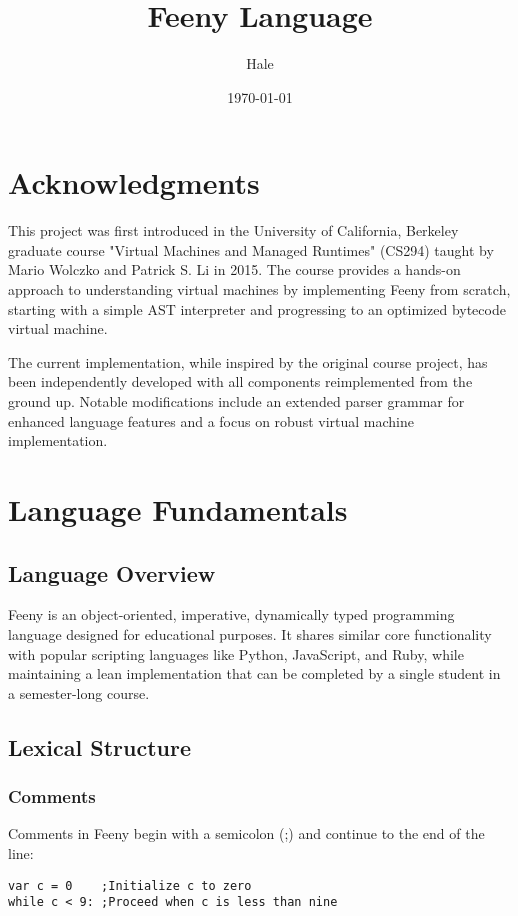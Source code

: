 \documentclass[12pt, a4paper]{article}
\title{Feeny Language}
\author{Hale}
\date{\today}
\begin{document}
\maketitle
\tableofcontents
\newpage

\section*{Acknowledgments} 
This project was first introduced in the University of California, Berkeley graduate course "Virtual Machines and Managed Runtimes" (CS294) taught by Mario Wolczko and Patrick S. Li in 2015. The course provides a hands-on approach to understanding virtual machines by implementing Feeny from scratch, starting with a simple AST interpreter and progressing to an optimized bytecode virtual machine.

The current implementation, while inspired by the original course project, has been independently developed with all components reimplemented from the ground up. Notable modifications include an extended parser grammar for enhanced language features and a focus on robust virtual machine implementation.
\section{Language Fundamentals}

\subsection{Language Overview}
Feeny is an object-oriented, imperative, dynamically typed programming language designed for educational purposes. It shares similar core functionality with popular scripting languages like Python, JavaScript, and Ruby, while maintaining a lean implementation that can be completed by a single student in a semester-long course.

\subsection{Lexical Structure}

\subsubsection{Comments}
Comments in Feeny begin with a semicolon (;) and continue to the end of the line:

\begin{lstlisting}
var c = 0    ;Initialize c to zero
while c < 9: ;Proceed when c is less than nine
\end{lstlisting}
\end{document}

